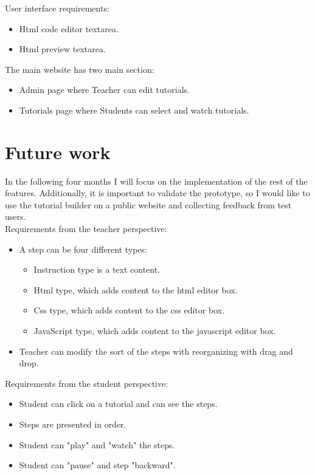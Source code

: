 \documentclass[11pt, a4paper, twoside, openright]{report}
\begin{document}
\noindent User interface requirements:
\begin{itemize}[noitemsep]
\item {} Html code editor textarea.
\item {} Html preview textarea.
\end{itemize}

\noindent The main website has two main section:
\begin{itemize}[noitemsep]
\item {} Admin page where Teacher can edit tutorials.
\item {} Tutorials page where Students can select and watch tutorials.
\end{itemize}

\section{Future work}

In the following four months I will focus on the implementation of the rest of the features. Additionally, it is important to validate the prototype, so I would like to use the tutorial builder on a public website and collecting feedback from test users. \\

\noindent Requirements from the teacher perspective:
\begin{itemize}[noitemsep]
\item A step can be four different types:
\begin{itemize}[noitemsep]
\item Instruction type is a text content.
\item Html type, which adds content to the html editor box.
\item Css type, which adds content to the css editor box.
\item JavaScript type, which adds content to the javascript editor box.
\end{itemize}
\item Teacher can modify the sort of the steps with reorganizing with drag and drop.
\end{itemize}

\noindent Requirements from the student perspective:
\begin{itemize}[noitemsep]
\item Student can click on a tutorial and can see the steps.
\item Steps are presented in order.
\item Student can "play" and "watch" the steps.
\item Student can "pause" and step "backward".
\end{itemize}
\end{document}
